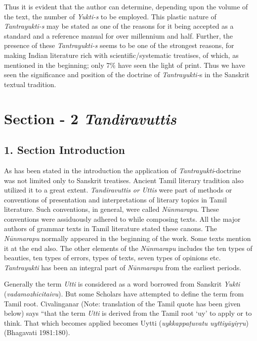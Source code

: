 Thus it is evident that the author can determine, depending upon the volume of the text, the number of \textit{Yukti-s} to be employed. This plastic nature of \textit{Tantrayukti-s} may be stated as one of the reasons for it being accepted as a standard and a reference manual for over millennium and half. Further, the presence of these \textit{Tantrayukti-s} seems to be one of the strongest reasons, for making Indian literature rich with scientific/systematic treatises, of which, as mentioned in the beginning; only 7\% have seen the light of print. Thus we have seen the significance and position of the doctrine of \textit{Tantrayukti-}s in the Sanskrit textual tradition.



\section*{Section - 2 \textit{Tandiravuttis}}

\subsection*{1. Section Introduction}

As has been stated in the introduction the application of \textit{Tantrayukti}-doctrine was not limited only to Sanskrit treatises. Ancient Tamil literary tradition also utilized it to a great extent. \textit{Tandiravuttis or Uttis} were part of methods or conventions of presentation and interpretations of literary topics in Tamil literature. Such conventions, in general, were called \textit{Nūnmarapu}. These conventions were assiduously adhered to while composing texts. All the major authors of grammar texts in Tamil literature stated these canons. The \textit{Nūnmarapu} normally appeared in the beginning of the work. Some texts mention it at the end also. The other elements of the \textit{Nūnmarapu} includes the ten types of beauties, ten types of errors, types of texts, seven types of opinions etc. \textit{Tantrayukti} has been an integral part of \textit{Nūnmarapu} from the earliest periods.

Generally the term \textit{Utti} is considered as a word borrowed from Sanskrit \textit{Yukti} (\textit{vadamozhicitaivu}). But some Scholars have attempted to define the term from Tamil root. Civalinganar (Note: translation of the Tamil quote has been given below) says “that the term \textit{Utti} is derived from the Tamil root ‘uy’ to apply or to think. That which becomes applied becomes Uytti (\textit{uykkappaṭuvatu uyttiyāyiṛṛu})\hfill (Bhagavati 1981:180).

